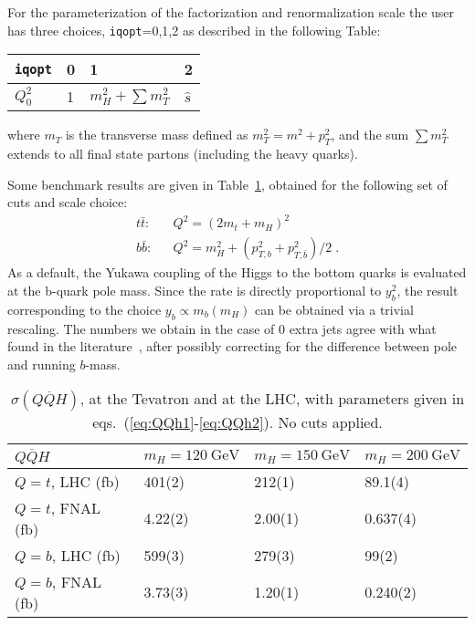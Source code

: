 \documentclass[paper]{JHEP3}
\newcommand{\gev}{\mbox{GeV}}
\newcommand{\ccaption}[2]{
    \begin{center}
    \parbox{0.85\textwidth}{
      \caption[#1]{\small{{#2}}}
      }
    \end{center}
    }
\def    \ba             {\begin{eqnarray}}
\def    \ea             {\end{eqnarray}}
\def    \gev            {\mbox{$\mathrm{GeV}$}}
\def    \bbar   {\bar{b}}
\def    \tbar   {\bar{t}}
\def    \Qbar   {\overline{Q}}
\def    \mH             {\mbox{$m_H$} }
\def    \mHsq             {\mbox{$m_H^2$} }
\def    \mt             {\mbox{$m_t$}}
\def    \ptsq           {\mbox{$p^2_T$}}
\def    \ptbsq           {\mbox{$p^2_{T,b}$}}
\def    \ptbbsq           {\mbox{$p^2_{T,\bar{b}}$}}
\def    \mT             {\mbox{$m_T$}}
\def    \mTsq           {\mbox{$m^2_T$}}
\begin{document}
For the parameterization of the factorization  and 
renormalization scale  the user has three 
choices, {\tt iqopt}=0,1,2  as described in the following Table:
{\renewcommand{\arraystretch}{1.2}
\begin{center}
\begin{tabular}{l||l|l|l}
{\tt iqopt} & 0 & 1 & 2  \\  \hline
$Q_0^2$ & 1 & $\mHsq + \sum \mTsq$  & $\hat{s}$  \\
\end{tabular}
\end{center}}
where $\mT$ is the transverse mass defined as $\mTsq=m^2+\ptsq$,
and the sum $\sum \mTsq $ extends to all final
state partons (including the heavy quarks).

Some benchmark results are given in Table~\ref{tab:QQhxs}, obtained
for the following set of cuts and scale choice:
\ba \label{eq:QQh1}
t\tbar : && Q^2=(2 \mt + \mH)^2
\\
b\bbar : && Q^2=\mHsq + (\ptbsq+\ptbbsq)/2 \; .
\label{eq:QQh2}
\ea
 As a default, the Yukawa coupling of the Higgs to the bottom
quarks is evaluated at the b-quark pole mass. Since the rate is
directly proportional to $y_b^2$, the result corresponding to the 
choice $y_b\propto m_b(\mH)$ can be obtained via a trivial rescaling.
The numbers we obtain in the case of 0 extra jets agree with what
 found in the literature~\cite{Carena:2000yx,spira}, after possibly
 correcting for the difference between pole and running $b$-mass.
{\renewcommand{\arraystretch}{1.2}
\begin{table}
\begin{center}
\begin{tabular}{||l|l|l|l||}\hline
$Q \Qbar H$  & $\mH = 120~\gev$  & $\mH = 150~\gev$ & $\mH = 200~\gev$ \\ 
\hline
$Q=t$, LHC (fb) & 401(2) & 212(1) & 89.1(4) \\ 
\hline
$Q=t$, FNAL (fb) & 4.22(2) & 2.00(1) & 0.637(4) \\ 
\hline
$Q=b$, LHC (fb) & 599(3) & 279(3) & 99(2) \\ 
\hline
$Q=b$, FNAL (fb) & 3.73(3) & 1.20(1) & 0.240(2) \\ 
\hline
\end{tabular}            
\ccaption{}{\label{tab:QQhxs} $\sigma(Q \Qbar H)$,
at the Tevatron and 
at the LHC, with parameters given in
eqs.~(\ref{eq:QQh1}-\ref{eq:QQh2}). No cuts applied.}
\end{center}
\end{table}}
\end{document}
